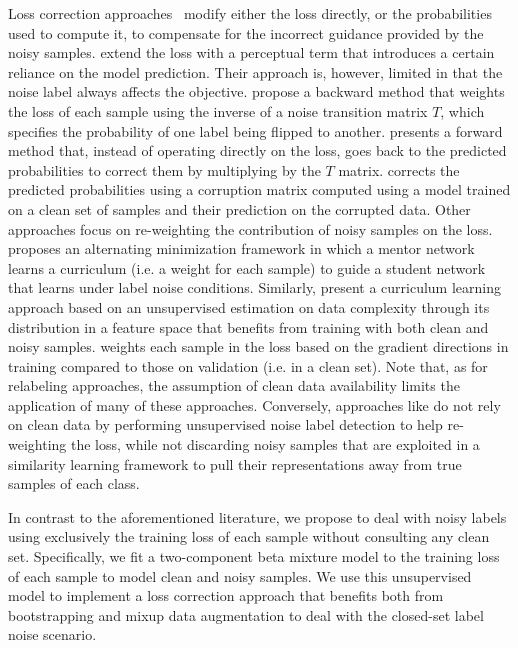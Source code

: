 \documentclass{article}
\begin{document}
Loss correction approaches~\cite{2015_ICLR_Bootstrapping,2018_ICML_MentorNet,2017_CVPR_ForwardLoss,2018_ICLR_mixup}
modify either the loss directly, or the probabilities used to compute
it, to compensate for the incorrect guidance provided by the noisy
samples. \cite{2015_ICLR_Bootstrapping} extend the loss with
a perceptual term that introduces a certain reliance on the model prediction. Their approach is, however, limited in that the noise
label always affects the objective. \cite{2017_CVPR_ForwardLoss}
propose a backward method that weights the loss of each sample using
the inverse of a noise transition matrix $T$, which specifies the probability
of one label being flipped to another. \cite{2017_CVPR_ForwardLoss}
presents a forward method that, instead of operating directly on the
loss, goes back to the predicted probabilities to correct them by
multiplying by the $T$ matrix.  \cite{2018_NIPS_GoldLoss}
corrects the predicted probabilities using a corruption matrix computed
using a model trained on a clean set of samples and their prediction
on the corrupted data. Other approaches focus on re-weighting
the contribution of noisy samples on the loss. \cite{2018_ICML_MentorNet}
proposes an alternating minimization framework in which a mentor network
learns a curriculum (i.e. a weight for each sample) to guide a student
network that learns under label noise conditions. Similarly, \cite{2018_ECCV_CurrNet}
present a curriculum learning approach based on an unsupervised estimation
on data complexity through its distribution in a feature space that
benefits from training with both clean and noisy samples. 
\cite{2018_ICML_L2ReweightNoise} weights each sample in the loss
based on the gradient directions in training compared to those on
validation (i.e. in a clean set). Note that, as for relabeling approaches,
the assumption of clean data availability limits the application of
many of these approaches. Conversely, approaches like \cite{2018_CVPR_IterativeNoise}
do not rely on clean data by performing unsupervised noise label detection
to help re-weighting the loss, while not discarding noisy samples
that are exploited in a similarity learning framework to pull their
representations away from true samples of each class.

In contrast to the aforementioned literature, we propose to deal with
noisy labels using exclusively the training loss of each sample without
consulting any clean set. Specifically, we fit a two-component
beta mixture model to the training loss of each sample to model clean
and noisy samples. We use this unsupervised model to implement
a loss correction approach that benefits both from bootstrapping \cite{2015_ICLR_Bootstrapping}
and mixup data augmentation \cite{2018_ICLR_mixup} to deal with the
closed-set label noise scenario.
\end{document}
